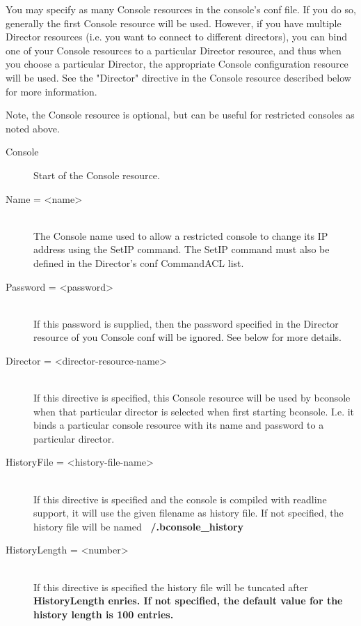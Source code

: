 You may specify as many Console resources in the console's conf file. If
you do so, generally the first Console resource will be used.  However, if
you have multiple Director resources (i.e. you want to connect to different
directors), you can bind one of your Console resources to a particular
Director resource, and thus when you choose a particular Director, the
appropriate Console configuration resource will be used. See the "Director"
directive in the Console resource described below for more information.

Note, the Console resource is optional, but can be useful for
restricted consoles as noted above.

\begin{description}
\item [Console]
Start of the Console resource.

\item [Name = {\textless}name{\textgreater}] \hfill \\
The Console name used to allow a restricted console to change
its IP address using the SetIP command. The SetIP command must
also be defined in the Director's conf CommandACL list.

\item [Password = {\textless}password{\textgreater}] \hfill \\
If this password is supplied, then the password specified in the
Director resource of you Console conf will be ignored.  See below
for more details.

\item [Director = {\textless}director-resource-name{\textgreater}] \hfill \\
If this directive is specified, this Console resource will be
used by bconsole when that particular director is selected
when first starting bconsole.  I.e. it binds a particular console
resource with its name and password to a particular director.

\item [HistoryFile = {\textless}history-file-name{\textgreater}] \hfill \\
If this directive is specified and the console is compiled with readline support,
it will use the given filename as history file.
If not specified, the history file will be named \bf{~/.bconsole\_history}

\item [HistoryLength = {\textless}number{\textgreater}] \hfill \\
If this directive is specified the history file will be tuncated after \bf{HistoryLength} enries.
If not specified, the default value for the history length is \bf{100} entries.




\end{description}
